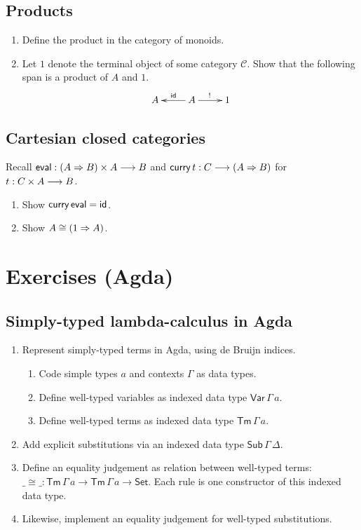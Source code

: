 \documentclass[a4paper,fleqn]{scrartcl}
\newcommand{\wttm}{\ensuremath{\mathsf{Tm}\,\Gamma\,a}}
\begin{document}
\subsection{Products}

\newcommand{\C}{\mathcal{C}}

\begin{enumerate}
\item Define the product in the category of monoids.
\item Let $1$ denote the terminal object of some category $\C$.
  Show that the following span is a product of $A$ and $1$.
\[
\xymatrix{
  A & A \ar[l]_{\tid} \ar[r]^{!} & 1
}
\]
\end{enumerate}

\subsection{Cartesian closed categories}

Recall $\mathsf{eval} : (A \Rightarrow B) \times A \longrightarrow B$ and
$\mathsf{curry}\, t : C \longrightarrow (A \Rightarrow B)$ for $t : C \times A \longrightarrow B$.
\begin{enumerate}
\item Show $\mathsf{curry}\,\mathsf{eval} = \mathsf{id}$.
\item Show $A \cong (1 \Rightarrow A)$.
\end{enumerate}

\clearpage

\section{Exercises (Agda)}

\subsection{Simply-typed lambda-calculus in Agda}

\begin{enumerate}
\item Represent simply-typed terms in Agda, using de Bruijn indices.
  \begin{enumerate}
  \item Code simple types $a$ and contexts $\Gamma$ as data types.
  \item Define well-typed variables as indexed data type
    $\mathsf{Var}\,\Gamma\,a$.
  \item Define well-typed terms as indexed data type \wttm.
  \end{enumerate}
\item Add explicit substitutions via an indexed data type
  $\mathsf{Sub}\,\Gamma\,\Delta$.
\item Define an equality judgement as relation between well-typed
  terms: ${\_{\cong}\_} : \wttm \to \wttm \to \mathsf{Set}$.
  Each rule is one constructor of this indexed data type.
\item Likewise, implement an equality judgement for well-typed substitutions.
\end{enumerate}
\end{document}
